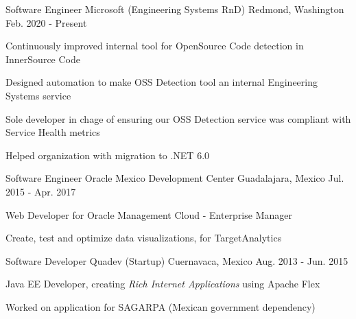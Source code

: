 

\begin{cventries}

  \cventry
    {Software Engineer} %
    {Microsoft (Engineering Systems RnD)} %
    {Redmond, Washington} %
    {Feb. 2020 - Present} %
    {
      \begin{cvitems} %
        \item {Continuously improved internal tool for OpenSource Code detection in InnerSource Code}
        \item {Designed automation to make OSS Detection tool an internal Engineering Systems service}
        \item {Sole developer in chage of ensuring our OSS Detection service was compliant with Service Health metrics}
        \item {Helped organization with migration to .NET 6.0}  
      \end{cvitems}
    }

  \cventry
    {Software Engineer} %
    {Oracle Mexico Development Center} %
    {Guadalajara, Mexico} %
    {Jul. 2015 - Apr. 2017} %
    {
        \begin{cvitems}
            \item {Web Developer for Oracle Management Cloud - Enterprise Manager}
            \item {Create, test and optimize data visualizations, for TargetAnalytics}
        \end{cvitems}
    }

\cventry
{Software Developer} %
{Quadev (Startup)} %
{Cuernavaca, Mexico} %
{Aug. 2013 - Jun. 2015} %
{
    \begin{cvitems}
        \item {Java EE Developer, creating \textit{Rich Internet Applications} using Apache Flex}
        \item {Worked on application for SAGARPA (Mexican government dependency)}
    \end{cvitems}
}

\end{cventries}